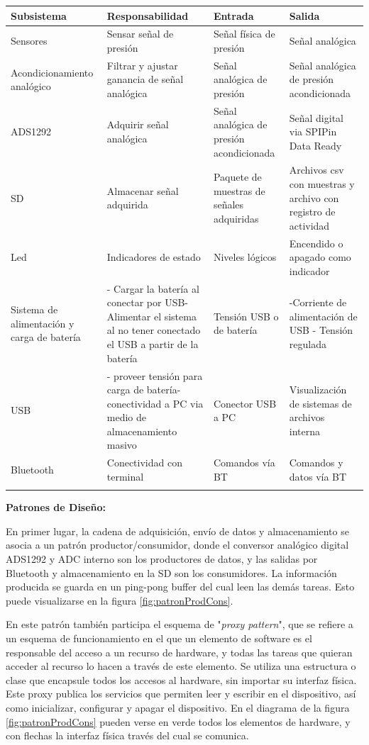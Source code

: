 \clearpage
\footnotesize
\begin{tabularx}{\textwidth}{XXXX}
\caption{Subsistemas del equipo} \\
\hline
\textbf{Subsistema} & \textbf{Responsabilidad} & \textbf{Entrada} & \textbf{Salida} \\ \hline
Sensores & Sensar señal de presión & Señal física de presión & Señal analógica \\ \hline
Acondicionamiento analógico & Filtrar y ajustar ganancia de señal analógica & Señal analógica de presión & Señal analógica de presión acondicionada \\ \hline
ADS1292 & Adquirir señal analógica & Señal analógica de presión acondicionada & Señal digital via SPIPin Data Ready \\ \hline
SD & Almacenar señal adquirida & Paquete de muestras de señales adquiridas & Archivos csv con muestras y archivo con registro de actividad \\ \hline
Led & Indicadores de estado & Niveles lógicos & Encendido o apagado como indicador \\ \hline
Sistema de alimentación y carga de batería & - Cargar la batería al conectar por USB- Alimentar el sistema al no tener conectado el USB a partir de la batería & Tensión USB o de batería & -Corriente de alimentación de USB - Tensión regulada \\ \hline
USB & - proveer tensión para carga de batería- conectividad a PC via medio de almacenamiento masivo & Conector USB a PC & Visualización de sistemas de archivos interna \\ \hline
Bluetooth & Conectividad con terminal & Comandos vía BT & Comandos y datos vía BT \\ \hline
\label{tab:subsistemas}\\
\end{tabularx}
\normalsize



\textbf{Patrones de Diseño:}

En primer lugar, la cadena de adquisición, envío de datos y almacenamiento se asocia a un patrón productor/consumidor, donde el conversor analógico digital ADS1292 y ADC interno son los productores de datos, y las salidas por Bluetooth y almacenamiento en la SD son los consumidores. La información producida se guarda en un ping-pong buffer \citep{zhou2017} del cual leen las demás tareas. Esto puede visualizarse en la figura \ref{fig:patronProdCons}.

En este patrón también participa el esquema de "\textit{proxy pattern}", que se refiere a un esquema de funcionamiento en el que un elemento de software es el responsable del acceso a un recurso de hardware, y todas las tareas que quieran acceder al recurso lo hacen a través de este elemento. Se utiliza una estructura o clase que encapsule todos los accesos al hardware, sin importar su interfaz física. Este proxy publica los servicios que permiten leer y escribir en el dispositivo, así como inicializar, configurar y apagar el dispositivo. En el diagrama de la figura \ref{fig:patronProdCons} pueden verse en verde todos los elementos de hardware, y con flechas la interfaz física través del cual se comunica. 

